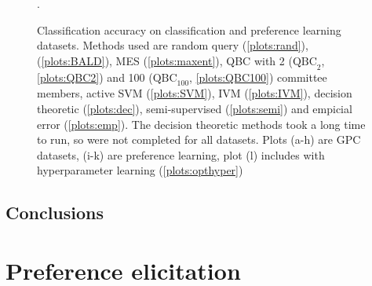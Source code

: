 \begin{figure}
	\caption[Evaluation of Bayesian active learning on real-world datasets]{Classification accuracy on classification and preference learning datasets. Methods used are random query (\ref{plots:rand}), \ourmethod (\ref{plots:BALD}),  MES (\ref{plots:maxent}), QBC with 2 ($\mbox{QBC}_2$, \ref{plots:QBC2}) and 100 ($\mbox{QBC}_{100}$, \ref{plots:QBC100}) committee members, active SVM (\ref{plots:SVM}), IVM (\ref{plots:IVM}), decision theoretic \citep{Kapoor2007} (\ref{plots:dec}), semi-supervised \citep{Zhu2003} (\ref{plots:semi}) and empicial error (\ref{plots:emp}). The decision theoretic methods took a long time to run, so were not completed for all datasets. Plots (a-h) are GPC datasets, (i-k) are preference learning, plot (l) includes \ourmethod with hyperparameter learning (\ref{plots:opthyper})}.
	\label{fig:all}
\end{figure}

\subsection{Conclusions}

\section{Preference elicitation}


